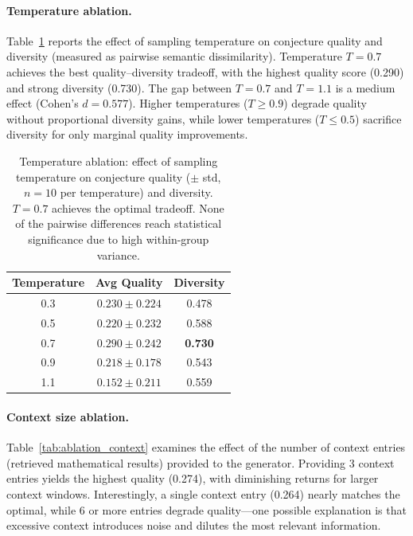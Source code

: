 \documentclass[11pt,a4paper]{article}
\begin{document}
\paragraph{Temperature ablation.}
Table~\ref{tab:ablation_temperature} reports the effect of sampling temperature on conjecture quality and diversity (measured as pairwise semantic dissimilarity). Temperature $T{=}0.7$ achieves the best quality--diversity tradeoff, with the highest quality score (0.290) and strong diversity (0.730). The gap between $T{=}0.7$ and $T{=}1.1$ is a medium effect (Cohen's $d = 0.577$). Higher temperatures ($T \geq 0.9$) degrade quality without proportional diversity gains, while lower temperatures ($T \leq 0.5$) sacrifice diversity for only marginal quality improvements.

\begin{table}[h]
\centering
\caption{Temperature ablation: effect of sampling temperature on conjecture quality ($\pm$ std, $n{=}10$ per temperature) and diversity. $T{=}0.7$ achieves the optimal tradeoff. None of the pairwise differences reach statistical significance due to high within-group variance.}
\label{tab:ablation_temperature}
\small
\begin{tabular}{@{}ccc@{}}
\toprule
\textbf{Temperature} & \textbf{Avg Quality} & \textbf{Diversity} \\
\midrule
0.3 & $0.230 \pm 0.224$ & 0.478 \\
0.5 & $0.220 \pm 0.232$ & 0.588 \\
0.7 & $\mathbf{0.290 \pm 0.242}$ & \textbf{0.730} \\
0.9 & $0.218 \pm 0.178$ & 0.543 \\
1.1 & $0.152 \pm 0.211$ & 0.559 \\
\bottomrule
\end{tabular}
\end{table}

\paragraph{Context size ablation.}
Table~\ref{tab:ablation_context} examines the effect of the number of context entries (retrieved mathematical results) provided to the generator. Providing 3 context entries yields the highest quality (0.274), with diminishing returns for larger context windows. Interestingly, a single context entry (0.264) nearly matches the optimal, while 6 or more entries degrade quality---one possible explanation is that excessive context introduces noise and dilutes the most relevant information.
\end{document}
